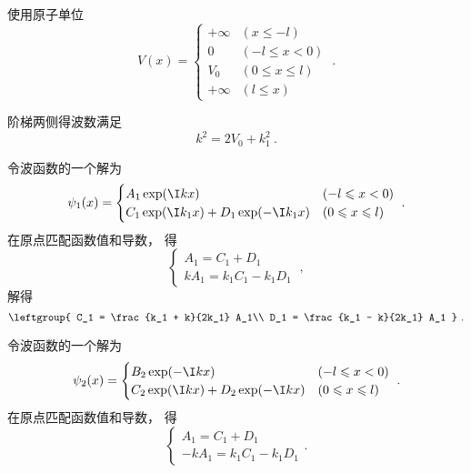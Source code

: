 
\begin{issues}
\issueDraft
\end{issues}


使用原子单位
\begin{equation}
V(x) =
\begin{cases}
+\infty  & (x \leqslant -l)\\
0  & (-l \leqslant x < 0)\\
V_0  & (0 \leqslant x \leqslant l)\\
+\infty  & (l \leqslant x)
\end{cases}~.
\end{equation}

阶梯两侧得波数满足
\begin{equation}
k^2 = 2V_0 + k_1^2~.
\end{equation}

令波函数的一个解为
\begin{equation}
\psi_1(x) =
\begin{cases}
A_1 \exp(\I k x)  & (-l \leqslant x < 0)\\
C_1 \exp(\I k_1 x) + D_1 \exp(-\I k_1 x) & (0 \leqslant x \leqslant l)
\end{cases}~.
\end{equation}
在原点匹配函数值和导数， 得
\begin{equation}
\begin{cases}
A_1 = C_1 + D_1\\
kA_1 = k_1 C_1 - k_1 D_1
\end{cases}~,
\end{equation}
解得
\begin{equation}
\leftgroup{
    C_1 = \frac{k_1 + k}{2k_1} A_1\\
    D_1 = \frac{k_1 - k}{2k_1} A_1
}~.
\end{equation}

令波函数的一个解为
\begin{equation}
\psi_2(x) =
\begin{cases}
B_2 \exp(-\I k x)  & (-l \leqslant x < 0)\\
C_2 \exp(\I k x) + D_2 \exp(-\I k x) & (0 \leqslant x \leqslant l)
\end{cases}~.
\end{equation}
在原点匹配函数值和导数， 得
\begin{equation}
\begin{cases}
A_1 = C_1 + D_1\\
-kA_1 = k_1 C_1 - k_1 D_1
\end{cases}.
\end{equation}
